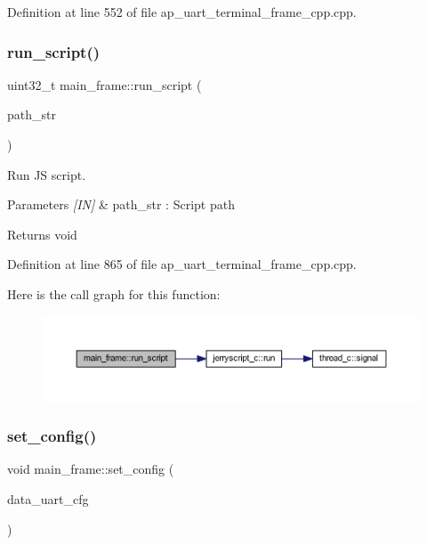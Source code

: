 Definition at line 552 of file ap\+\_\+uart\+\_\+terminal\+\_\+frame\+\_\+cpp.\+cpp.

\mbox{\label{group___u_a_r_t__terminal_gaa0306b1e548f3cc2bc2ac0dab0d95575}} 
\subsubsection{run\_script()}
{\footnotesize\ttfamily uint32\+\_\+t main\+\_\+frame\+::run\+\_\+script (\begin{DoxyParamCaption}\item[{wx\+String}]{path\+\_\+str }\end{DoxyParamCaption})}



Run JS script. 


\begin{DoxyParams}{Parameters}
{\em \mbox{[}\+I\+N\mbox{]}} & path\+\_\+str \+: Script path \\
\hline
\end{DoxyParams}
\begin{DoxyReturn}{Returns}
void 
\end{DoxyReturn}


Definition at line 865 of file ap\+\_\+uart\+\_\+terminal\+\_\+frame\+\_\+cpp.\+cpp.

Here is the call graph for this function\+:
\nopagebreak
\begin{figure}[H]
\begin{center}
\leavevmode
\includegraphics[width=350pt]{group___u_a_r_t__terminal_gaa0306b1e548f3cc2bc2ac0dab0d95575_cgraph}
\end{center}
\end{figure}
\mbox{\label{group___u_a_r_t__terminal_ga72eb7df682e5f2cd35b151b638922605}} 
\subsubsection{set\_config()}
{\footnotesize\ttfamily void main\+\_\+frame\+::set\+\_\+config (\begin{DoxyParamCaption}\item[{\textbf{ uart\+\_\+cfg\+\_\+t}}]{data\+\_\+uart\+\_\+cfg }\end{DoxyParamCaption})}



